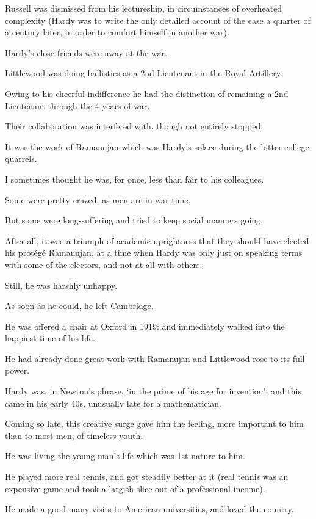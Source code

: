 \documentclass{article}
\numberwithin{equation}{section}
\begin{document}
%
Russell was dismissed from his lectureship, in circumstances of overheated complexity (Hardy was to write the only detailed account of the case a quarter of a century later, in order to comfort himself in another war).

Hardy's close friends were away at the war.

Littlewood was doing ballistics as a 2nd Lieutenant in the Royal Artillery.

Owing to his cheerful indifference he had the distinction of remaining a 2nd Lieutenant through the 4 years of war.

Their collaboration was interfered with, though not entirely stopped.

It was the work of Ramanujan which was Hardy's solace during the bitter college quarrels.

%
I sometimes thought he was, for once, less than fair to his colleagues.

Some were pretty crazed, as men are in war-time.

But some were long-suffering and tried to keep social manners going.

After all, it was a triumph of academic uprightness that they should have elected his prot\'eg\'e Ramanujan, at a time when Hardy was only just on speaking terms with some of the electors, and not at all with others.

%
Still, he was harshly unhappy.

As soon as he could, he left Cambridge.

He was offered a chair at Oxford in 1919: and immediately walked into the happiest time of his life.

He had already done great work with Ramanujan and Littlewood rose to its full power.

Hardy was, in Newton's phrase, `in the prime of his age for invention', and this came in his early 40s, unusually late for a mathematician.

%
Coming so late, this creative surge gave him the feeling, more important to him than to most men, of timeless youth.

He was living the young man's life which was 1st nature to him.

He played more real tennis, and got steadily better at it (real tennis was an expensive game and took a largish slice out of a professional income).

He made a good many visits to American universities, and loved the country.
\end{document}
